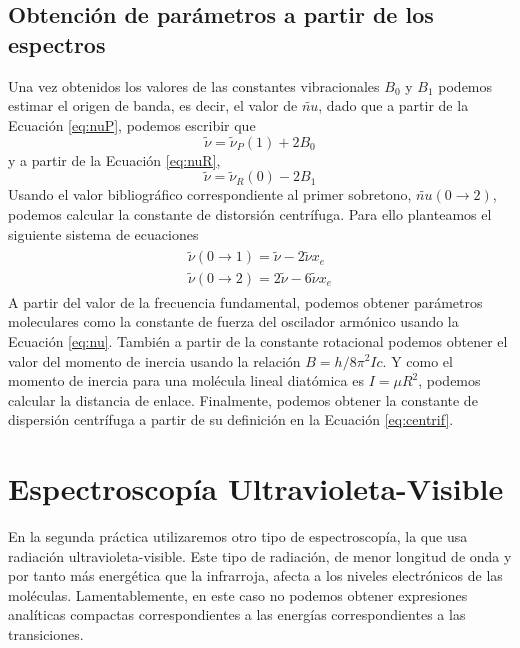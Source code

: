 \documentclass{tufte-book}
\begin{document}
\section{Obtención de parámetros a partir de los espectros}
Una vez obtenidos los valores de las constantes
vibracionales $B_0$ y $B_1$ podemos estimar el origen de banda,
es decir, el valor de $\tilde{nu}$, dado que a partir de la 
Ecuación \ref{eq:nuP}, podemos escribir que
\begin{equation}
    \tilde{\nu} = \tilde{\nu}_P(1) + 2B_0 
\end{equation}
y a partir de la Ecuación \ref{eq:nuR},
\begin{equation}
    \tilde{\nu} = \tilde{\nu}_R(0) - 2B_1 
\end{equation}
Usando el valor bibliográfico correspondiente al primer sobretono,
$\tilde{nu}(0\rightarrow 2)$, podemos calcular la constante de 
distorsión centrífuga. Para ello planteamos el siguiente
sistema de ecuaciones
\begin{align}
\begin{split}
\tilde{\nu}(0\rightarrow 1) = \tilde{\nu} - 2\tilde{\nu}x_e\\
\tilde{\nu}(0\rightarrow 2) = 2\tilde{\nu} - 6\tilde{\nu}x_e
\end{split}
\end{align}
A partir del valor de la frecuencia fundamental, podemos
obtener parámetros moleculares como la constante de fuerza
del oscilador armónico usando la Ecuación \ref{eq:nu}.
También a partir de la constante rotacional podemos obtener
el valor del momento de inercia usando la relación 
$B=h/8\pi^2Ic$. Y como el momento de inercia para una molécula
lineal diatómica es $I=\mu R^2$, podemos calcular la 
distancia de enlace. Finalmente, podemos obtener la
constante de dispersión centrífuga a partir de su definición
en la Ecuación \ref{eq:centrif}.

\chapter[UV-visible]{Espectroscopía Ultravioleta-Visible}
En la segunda práctica utilizaremos otro tipo de espectroscopía,
la que usa radiación ultravioleta-visible. Este tipo de radiación,
de menor longitud de onda y por tanto más energética que la 
infrarroja, afecta a los niveles electrónicos de las moléculas.
Lamentablemente, en este caso no podemos obtener expresiones
analíticas compactas correspondientes a las energías 
correspondientes a las transiciones. 
\end{document}
